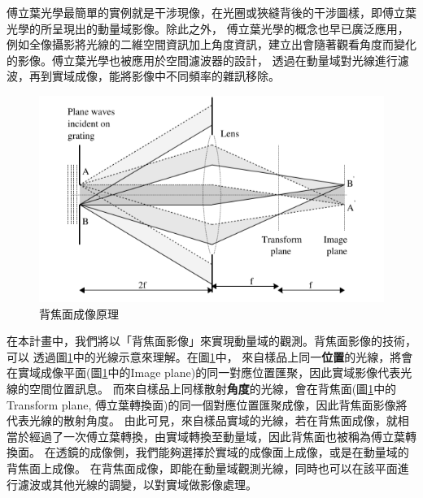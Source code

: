 \documentclass[12pt]{article}
\begin{document}
傅立葉光學最簡單的實例就是干涉現像，在光圈或狹縫背後的干涉圖樣，即傅立葉光學的所呈現出的動量域影像。除此之外，
傅立葉光學的概念也早已廣泛應用，例如全像攝影將光線的二維空間資訊加上角度資訊，建立出會隨著觀看角度而變化的影像。傅立葉光學也被應用於空間濾波器的設計，
透過在動量域對光線進行濾波，再到實域成像，能將影像中不同頻率的雜訊移除。
\begin{figure}[h]
    \centering
    \includegraphics[width=\linewidth]{bfp.png}
    \caption{背焦面成像原理\cite{lightfantastic}}
    \label{bfpimage}
\end{figure}

在本計畫中，我們將以「背焦面影像」來實現動量域的觀測。背焦面影像的技術，可以
透過圖\ref{bfpimage}中的光線示意來理解。在圖\ref{bfpimage}中，
來自樣品上同一\textbf{位置}的光線，將會在實域成像平面(圖\ref{bfpimage}中的Image plane)的同一對應位置匯聚，因此實域影像代表光線的空間位置訊息。
而來自樣品上同樣散射\textbf{角度}的光線，會在背焦面(圖\ref{bfpimage}中的Transform plane, 傅立葉轉換面)的同一個對應位置匯聚成像，因此背焦面影像將代表光線的散射角度。
由此可見，來自樣品實域的光線，若在背焦面成像，就相當於經過了一次傅立葉轉換，由實域轉換至動量域，因此背焦面也被稱為傅立葉轉換面。
在透鏡的成像側，我們能夠選擇於實域的成像面上成像，或是在動量域的背焦面上成像。
在背焦面成像，即能在動量域觀測光線，同時也可以在該平面進行濾波或其他光線的調變，以對實域做影像處理。
\end{document}
